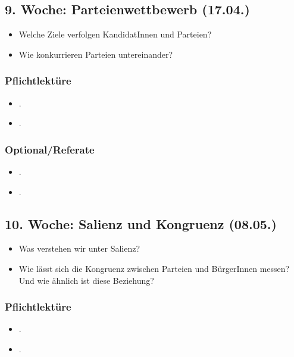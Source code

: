 \documentclass[abstract=on,parskip=full,headings=standardclasses,fontsize=11pt,paper=a4]{scrartcl}
\begin{document}
\subsection{9. Woche: Parteienwettbewerb (17.04.)}

\begin{itemize}
\renewcommand\labelitemi{--}
\item Welche Ziele verfolgen KandidatInnen und Parteien?
\item Wie konkurrieren Parteien untereinander? 
\end{itemize}

\subsubsection*{Pflichtlektüre}
\begin{itemize}
\item {}.
\item {}.
\end{itemize}

\subsubsection*{Optional/Referate}
\begin{itemize}
\item {}.
\item {}.
\end{itemize}


\subsection{10. Woche: Salienz und Kongruenz (08.05.)}


\begin{itemize}
\renewcommand\labelitemi{--}
\item Was verstehen wir unter Salienz?
\item Wie lässt sich die Kongruenz zwischen Parteien und BürgerInnen messen? Und wie ähnlich ist diese Beziehung?
\end{itemize}

\subsubsection*{Pflichtlektüre}
\begin{itemize}
\item {}.
\item {}.
\end{itemize}
\end{document}
